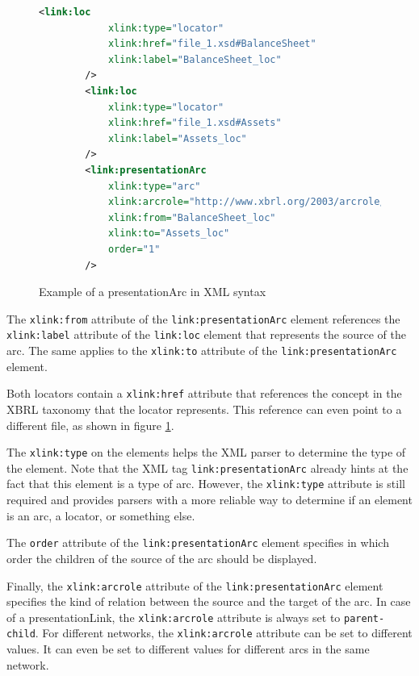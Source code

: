 \begin{figure}[H]
    \begin{lstlisting}[language=XML]
        <link:loc 
            xlink:type="locator" 
            xlink:href="file_1.xsd#BalanceSheet"
            xlink:label="BalanceSheet_loc"
        />
        <link:loc 
            xlink:type="locator" 
            xlink:href="file_1.xsd#Assets"
            xlink:label="Assets_loc"
        />
        <link:presentationArc 
            xlink:type="arc" 
            xlink:arcrole="http://www.xbrl.org/2003/arcrole/parent-child" 
            xlink:from="BalanceSheet_loc" 
            xlink:to="Assets_loc"
            order="1"
        />
    \end{lstlisting}
    \caption{Example of a presentationArc in XML syntax}
    \label{fig:example_presentation_arc_xml}
\end{figure}

The \texttt{xlink:from} attribute of the \texttt{link:presentationArc} element references the \texttt{xlink:label} attribute of the \texttt{link:loc} element that represents the source of the arc.
The same applies to the \texttt{xlink:to} attribute of the \texttt{link:presentationArc} element.

Both locators contain a \texttt{xlink:href} attribute that references the concept in the XBRL taxonomy that the locator represents.
This reference can even point to a different file, as shown in figure \ref{fig:example_presentation_arc_xml}.

The \texttt{xlink:type} on the elements helps the XML parser to determine the type of the element.
Note that the XML tag \texttt{link:presentationArc} already hints at the fact that this element is a type of arc.
However, the \texttt{xlink:type} attribute is still required and provides parsers with a more reliable way to determine if an element is an arc, a locator, or something else. 

The \texttt{order} attribute of the \texttt{link:presentationArc} element specifies in which order the children of the source of the arc should be displayed.

\label{sec:arcrole}
Finally, the \texttt{xlink:arcrole} attribute of the \texttt{link:presentationArc} element specifies the kind of relation between the source and the target of the arc.
In case of a presentationLink, the \texttt{xlink:arcrole} attribute is always set to \texttt{parent-child}.
For different networks, the \texttt{xlink:arcrole} attribute can be set to different values.
It can even be set to different values for different arcs in the same network.

